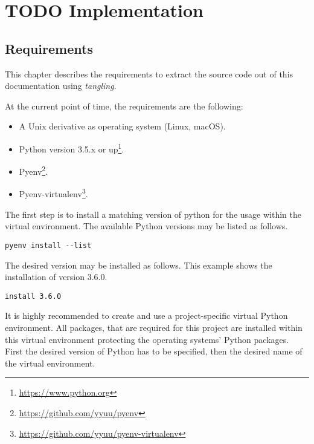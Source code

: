 \documentclass[10pt, openright, notitlepage]{scrreprt}
\begin{document}
\chapter{{\bfseries\sffamily TODO} Implementation}
\label{sec:orgcfeb7e6}

\section{Requirements}
\label{sec:org7d9cee3}

This chapter describes the requirements to extract the source code out of this
documentation using \emph{tangling}.

At the current point of time, the requirements are the following:

\begin{itemize}
\item A Unix derivative as operating system (Linux, macOS).
\item Python version 3.5.x or up\footnote{\url{https://www.python.org}}.
\item Pyenv\footnote{\url{https://github.com/yyuu/pyenv}}.
\item Pyenv-virtualenv\footnote{\url{https://github.com/yyuu/pyenv-virtualenv}}.
\end{itemize}

The first step is to install a matching version of python for the usage within
the virtual environment. The available Python versions may be listed as follows.

\begin{listing}[H]
\begin{verbatim}
pyenv install --list
\end{verbatim}
\caption{\label{org579cab3}
Listing all available versions of Python for use in Pyenv.}
\end{listing}

The desired version may be installed as follows. This example shows the
installation of version 3.6.0.

\begin{listing}[H]
\begin{verbatim}
install 3.6.0
\end{verbatim}
\caption{\label{org71b3761}
Installation of Python version 3.6.0 for the usage with Pyenv.}
\end{listing}

It is highly recommended to create and use a project-specific virtual Python
environment. All packages, that are required for this project are installed
within this virtual environment protecting the operating systems' Python
packages.
First the desired version of Python has to be specified, then the desired name
of the virtual environment.
\end{document}
